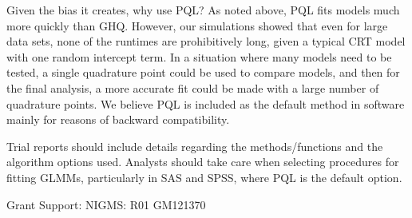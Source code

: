 \documentclass[Afour,times,sagev,doublespace]{sagej}
\begin{document}
Given the bias it creates, why use PQL? As noted above, PQL fits models much more quickly than GHQ. However, our simulations showed that even for large data sets, none of the runtimes are prohibitively long, given a typical CRT model with one random intercept term. In a situation where many models need to be tested, a single quadrature point could be used to compare models, and then for the final analysis, a more accurate fit could be made with a large number of quadrature points.  We believe PQL is included as the default method in software mainly for reasons of backward compatibility.

Trial reports should include details regarding the methods/functions and the algorithm options used.  Analysts should take care when selecting procedures for fitting GLMMs, particularly in SAS and SPSS, where PQL is the default option.





\begin{funding}
Grant Support: NIGMS: R01 GM121370
\end{funding}
\end{document}
